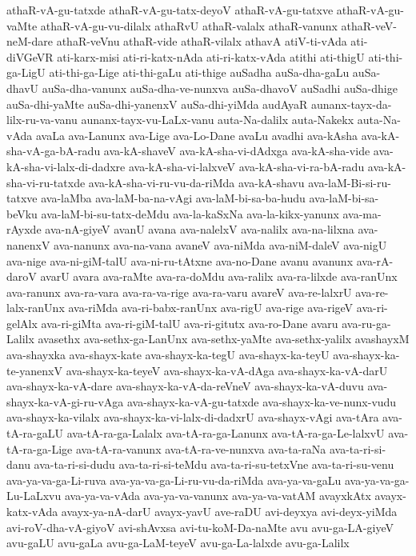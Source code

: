 {athaR-vA-gu-tatxde
athaR-vA-gu-tatx-deyoV
athaR-vA-gu-tatxve
athaR-vA-gu-vaMte
athaR-vA-gu-vu-dilalx
athaRvU
athaR-valalx
athaR-vanunx
athaR-veV-neM-dare
athaR-veVnu
athaR-vide
athaR-vilalx
athavA
atiV-ti-vAda
ati-diVGeVR
ati-karx-misi
ati-ri-katx-nAda
ati-ri-katx-vAda
atithi
ati-thigU
ati-thi-ga-LigU
ati-thi-ga-Lige
ati-thi-gaLu
ati-thige
auSadha
auSa-dha-gaLu
auSa-dhavU
auSa-dha-vanunx
auSa-dha-ve-nunxva
auSa-dhavoV
auSadhi
auSa-dhige
auSa-dhi-yaMte
auSa-dhi-yanenxV
auSa-dhi-yiMda
audAyaR
aunanx-tayx-da-lilx-ru-va-vanu
aunanx-tayx-vu-LaLx-vanu
auta-Na-dalilx
auta-Nakekx
auta-Na-vAda
avaLa
ava-Lanunx
ava-Lige
ava-Lo-Dane
avaLu
avadhi
ava-kAsha
ava-kA-sha-vA-ga-bA-radu
ava-kA-shaveV
ava-kA-sha-vi-dAdxga
ava-kA-sha-vide
ava-kA-sha-vi-lalx-di-dadxre
ava-kA-sha-vi-lalxveV
ava-kA-sha-vi-ra-bA-radu
ava-kA-sha-vi-ru-tatxde
ava-kA-sha-vi-ru-vu-da-riMda
ava-kA-shavu
ava-laM-Bi-si-ru-tatxve
ava-laMba
ava-laM-ba-na-vAgi
ava-laM-bi-sa-ba-hudu
ava-laM-bi-sa-beVku
ava-laM-bi-su-tatx-deMdu
ava-la-kaSxNa
ava-la-kikx-yanunx
ava-ma-rAyxde
ava-nA-giyeV
avanU
avana
ava-nalelxV
ava-nalilx
ava-na-lilxna
ava-nanenxV
ava-nanunx
ava-na-vana
avaneV
ava-niMda
ava-niM-daleV
ava-nigU
ava-nige
ava-ni-giM-talU
ava-ni-ru-tAtxne
ava-no-Dane
avanu
avanunx
ava-rA-daroV
avarU
avara
ava-raMte
ava-ra-doMdu
ava-ralilx
ava-ra-lilxde
ava-ranUnx
ava-ranunx
ava-ra-vara
ava-ra-va-rige
ava-ra-varu
avareV
ava-re-lalxrU
ava-re-lalx-ranUnx
ava-riMda
ava-ri-babx-ranUnx
ava-rigU
ava-rige
ava-rigeV
ava-ri-gelAlx
ava-ri-giMta
ava-ri-giM-talU
ava-ri-gitutx
ava-ro-Dane
avaru
ava-ru-ga-Lalilx
avasethx
ava-sethx-ga-LanUnx
ava-sethx-yaMte
ava-sethx-yalilx
avashayxM
ava-shayxka
ava-shayx-kate
ava-shayx-ka-tegU
ava-shayx-ka-teyU
ava-shayx-ka-te-yanenxV
ava-shayx-ka-teyeV
ava-shayx-ka-vA-dAga
ava-shayx-ka-vA-darU
ava-shayx-ka-vA-dare
ava-shayx-ka-vA-da-reVneV
ava-shayx-ka-vA-duvu
ava-shayx-ka-vA-gi-ru-vAga
ava-shayx-ka-vA-gu-tatxde
ava-shayx-ka-ve-nunx-vudu
ava-shayx-ka-vilalx
ava-shayx-ka-vi-lalx-di-dadxrU
ava-shayx-vAgi
ava-tAra
ava-tA-ra-gaLU
ava-tA-ra-ga-Lalalx
ava-tA-ra-ga-Lanunx
ava-tA-ra-ga-Le-lalxvU
ava-tA-ra-ga-Lige
ava-tA-ra-vanunx
ava-tA-ra-ve-nunxva
ava-ta-raNa
ava-ta-ri-si-danu
ava-ta-ri-si-dudu
ava-ta-ri-si-teMdu
ava-ta-ri-su-tetxVne
ava-ta-ri-su-venu
ava-ya-va-ga-Li-ruva
ava-ya-va-ga-Li-ru-vu-da-riMda
ava-ya-va-gaLu
ava-ya-va-ga-Lu-LaLxvu
ava-ya-va-vAda
ava-ya-va-vanunx
ava-ya-va-vatAM
avayxkAtx
avayx-katx-vAda
avayx-ya-nA-darU
avayx-yavU
ave-raDU
avi-deyxya
avi-deyx-yiMda
avi-roV-dha-vA-giyoV
avi-shAvxsa
avi-tu-koM-Da-naMte
avu
avu-ga-LA-giyeV
avu-gaLU
avu-gaLa
avu-ga-LaM-teyeV
avu-ga-La-lalxde
avu-ga-Lalilx
}
